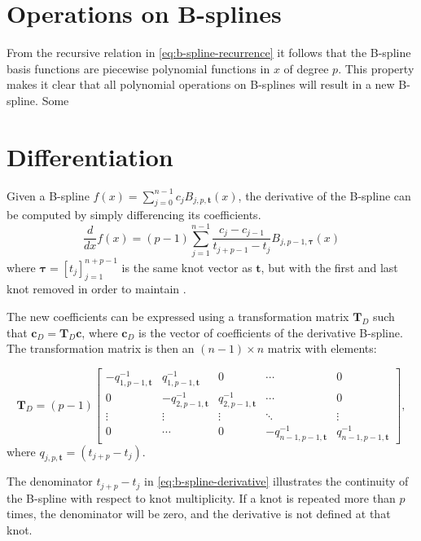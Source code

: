 \section{Operations on B-splines}
From the recursive relation in \cref{eq:b-spline-recurrence} it follows that the B-spline basis functions are piecewise polynomial functions in $x$ of degree $p$. This property makes it clear that all polynomial operations on B-splines will result in a new B-spline. Some 


\section{Differentiation}\label{sec:derivative}
Given a B-spline $f(x) = \sum_{j=0}^{n-1} c_j B_{j, p, \mathbf{t}}(x)$,
the derivative of the B-spline can be computed by simply differencing its coefficients. 
\begin{equation}\label{eq:b-spline-derivative}
    \frac{d}{dx} f(x) = (p-1) \sum_{j=1}^{n-1} \frac{c_j-c_{j-1}}{t_{j+p-1}-t_j} B_{j, p-1, \boldsymbol{\tau}}(x)
\end{equation}
where $\boldsymbol{\tau} = [t_j]_{j=1}^{n+p-1}$ is the same knot vector as $\mathbf{t}$, but with the first and last knot removed in order to maintain .

The new coefficients can be expressed using a transformation matrix $\mathbf T_D$ such that $\mathbf{c}_D = \mathbf T_D \mathbf{c}$, where $\mathbf{c}_D$ is the vector of coefficients of the derivative B-spline. The transformation matrix is then an $(n-1) \times n$ matrix with elements:

\begin{equation}
    \mathbf T_D = (p-1) \begin{bmatrix}
        -q_{1,p-1,\mathbf{t}}^{-1} & q_{1,p-1,\mathbf{t}}^{-1} & 0 & \cdots & 0 \\
        0 & -q_{2,p-1,\mathbf{t}}^{-1} & q_{2,p-1,\mathbf{t}}^{-1} & \cdots & 0 \\
        \vdots & \vdots & \vdots & \ddots & \vdots \\
        0 & \cdots & 0 & -q_{n-1,p-1,\mathbf{t}}^{-1} & q_{n-1,p-1,\mathbf{t}}^{-1} 
    \end{bmatrix},
\end{equation}
where $q_{j,p,\mathbf{t}} = (t_{j+p}-t_j)$.


The denominator $t_{j+p}-t_j$ in \cref{eq:b-spline-derivative} illustrates the continuity of the B-spline with respect to knot multiplicity. If a knot is repeated more than $p$ times, the denominator will be zero, and the derivative is not defined at that knot.

